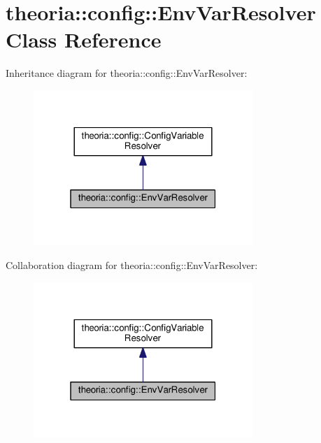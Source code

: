 \hypertarget{classtheoria_1_1config_1_1EnvVarResolver}{\section{theoria\+:\+:config\+:\+:Env\+Var\+Resolver Class Reference}
\label{classtheoria_1_1config_1_1EnvVarResolver}
}


Inheritance diagram for theoria\+:\+:config\+:\+:Env\+Var\+Resolver\+:
\nopagebreak
\begin{figure}[H]
\begin{center}
\leavevmode
\includegraphics[width=235pt]{classtheoria_1_1config_1_1EnvVarResolver__inherit__graph}
\end{center}
\end{figure}


Collaboration diagram for theoria\+:\+:config\+:\+:Env\+Var\+Resolver\+:
\nopagebreak
\begin{figure}[H]
\begin{center}
\leavevmode
\includegraphics[width=235pt]{classtheoria_1_1config_1_1EnvVarResolver__coll__graph}
\end{center}
\end{figure}
